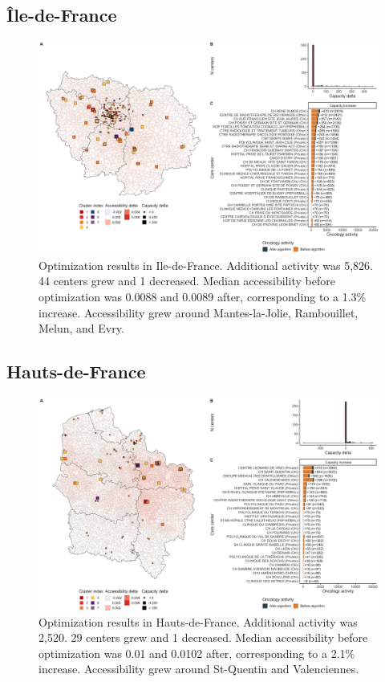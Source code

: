 \subsection*{Île-de-France}

\begin{figure}[h]
    \includegraphics[width=\textwidth]{images/camion/optim_region/optim_Ile-de-France.png}
    \centering
    \caption{
        Optimization results in Ile-de-France. Additional activity was 5,826. 44 centers grew and 1 decreased. Median accessibility before optimization was 0.0088 and 0.0089 after, corresponding to a 1.3\% increase. Accessibility grew around Mantes-la-Jolie, Rambouillet, Melun, and Evry.
    }
\end{figure}

\subsection*{Hauts-de-France}

\begin{figure}[h]
    \includegraphics[width=\textwidth]{images/camion/optim_region/optim_Hauts-de-France.png}
    \centering
    \caption{
        Optimization results in Hauts-de-France. Additional activity was 2,520. 29 centers grew and 1 decreased. Median accessibility before optimization was 0.01 and 0.0102 after, corresponding to a 2.1\% increase. Accessibility grew around St-Quentin and Valenciennes.
    }
\end{figure}

